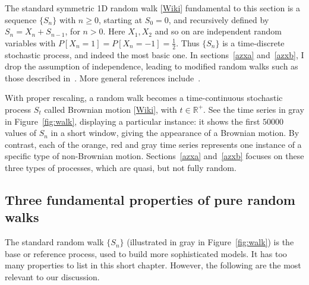 \documentclass[oneside,10pt]{book}
\begin{document}
The standard symmetric 1D \textcolor{index}{random walk} [\href{https://en.wikipedia.org/wiki/Random_walk}{Wiki}] fundamental to this section is a sequence $\{S_n\}$ with $n\geq 0$, starting at $S_0=0$, and recursively defined by
$S_{n}=X_{n}+S_{n-1}$, for $n>0$.  Here $X_1,X_2$ and so on are independent random variables with $P[X_n=1]=P[X_n=-1]=\frac{1}{2}$.
 Thus $\{S_n\}$ is a time-discrete stochastic process, and indeed the most basic one. In sections~\ref{azxa} and~\ref{azxb}, I drop the assumption
 of independence, leading to modified random walks such as those described in~\cite{nkrn2018,lanwu2012}.
More general references include~\cite{gtm2021,peresbrown}.

With proper rescaling, a random walk becomes a time-continuous stochastic process $S_t$ called \textcolor{index}{Brownian motion} [\href{https://en.wikipedia.org/wiki/Brownian_motion}{Wiki}], with $t\in\mathbb{R}^+$. See the time series in gray in Figure~\ref{fig:walk}, displaying a particular instance: it shows the first $\num{50000}$ values of
 $S_n$ in a short window, giving the appearance of a Brownian motion.
By contrast, each of the orange, red and gray time series represents one instance of a specific type of non-Brownian motion. Sections~\ref{azxa} and~\ref{azxb} focuses on these three types of processes,  which are quasi, but not fully random.


\subsection{Three fundamental properties of pure random walks}\label{poyt}

The standard random walk $\{S_n\}$ (illustrated in gray in Figure~\ref{fig:walk}) is the base or reference process, used to build more sophisticated models. It has too many properties to list in this short chapter. However, the following are the most relevant to our discussion.
\end{document}
